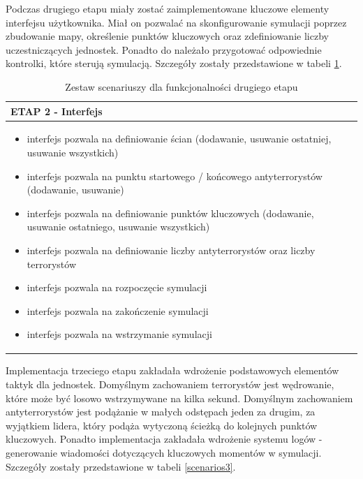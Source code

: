 Podczas drugiego etapu miały zostać zaimplementowane kluczowe elementy interfejsu użytkownika. Miał on pozwalać na skonfigurowanie symulacji poprzez zbudowanie mapy, określenie punktów kluczowych oraz zdefiniowanie liczby uczestniczących jednostek. Ponadto do należało przygotować odpowiednie kontrolki, które sterują symulacją. Szczegóły zostały przedstawione w tabeli \ref{scenarios2}. 

\begin{table}
\begin{center}
\begin{tabular}{|p{}|}
\hline
ETAP 2 - Interfejs\\\hline
	\begin{itemize}
		\setlength\itemsep{0pt}
		\item interfejs pozwala na definiowanie ścian (dodawanie, usuwanie ostatniej, usuwanie wszystkich)
		\item interfejs pozwala na punktu startowego / końcowego antyterrorystów (dodawanie, usuwanie)
		\item interfejs pozwala na definiowanie punktów kluczowych (dodawanie, usuwanie ostatniego, usuwanie wszystkich)
		\item interfejs pozwala na definiowanie liczby antyterrorystów oraz liczby terrorystów
		\item interfejs pozwala na rozpoczęcie symulacji
		\item interfejs pozwala na zakończenie symulacji
		\item interfejs pozwala na wstrzymanie symulacji
	\end{itemize}
\\\hline
\end{tabular}
\caption {Zestaw scenariuszy dla funkcjonalności drugiego etapu\label{scenarios2}}
\end{center}
\end{table} 

Implementacja trzeciego etapu zakładała wdrożenie podstawowych elementów taktyk dla jednostek. Domyślnym zachowaniem terrorystów jest wędrowanie, które może być losowo wstrzymywane na kilka sekund. Domyślnym zachowaniem antyterrorystów jest podążanie w małych odstępach jeden za drugim, za wyjątkiem lidera, który podąża wytyczoną ścieżką do kolejnych punktów kluczowych. Ponadto implementacja zakładała wdrożenie systemu logów - generowanie wiadomości dotyczących kluczowych momentów w symulacji. Szczegóły zostały przedstawione w tabeli \ref{scenarios3}.

